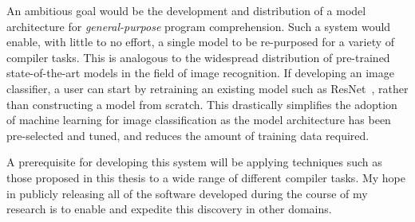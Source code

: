 An ambitious goal would be the development and distribution of a model architecture for \emph{general-purpose} program comprehension. Such a system would enable, with little to no effort, a single model to be re-purposed for a variety of compiler tasks. This is analogous to the widespread distribution of pre-trained state-of-the-art models in the field of image recognition. If developing an image classifier, a user can start by retraining an existing model such as ResNet~\cite{He2016}, rather than constructing a model from scratch. This drastically simplifies the adoption of machine learning for image classification as the model architecture has been pre-selected and tuned, and reduces the amount of training data required.

A prerequisite for developing this system will be applying techniques such as those proposed in this thesis to a wide range of different compiler tasks. My hope in publicly releasing all of the software developed during the course of my research is to enable and expedite this discovery in other domains.



